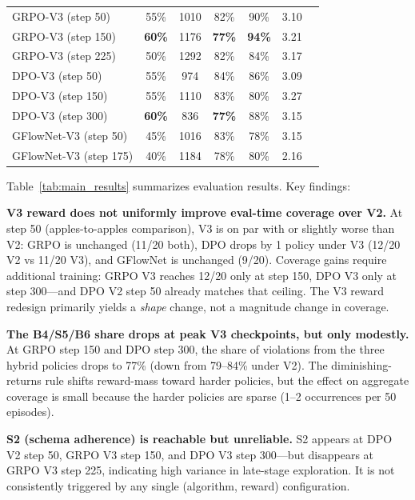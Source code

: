 \documentclass{article}
\begin{document}
\begin{table}[t]
\begin{tabular}{lcccccc}
GRPO-V3 (step 50)        & 55\%       & 1010       & 82\%       & 90\%       & 3.10       \\
GRPO-V3 (step 150)       & \textbf{60\%} & 1176    & \textbf{77\%} & \textbf{94\%} & 3.21       \\
GRPO-V3 (step 225)       & 50\%       & 1292       & 82\%       & 84\%       & 3.17       \\
DPO-V3 (step 50)         & 55\%       & 974        & 84\%       & 86\%       & 3.09       \\
DPO-V3 (step 150)        & 55\%       & 1110       & 83\%       & 80\%       & 3.27       \\
DPO-V3 (step 300)        & \textbf{60\%} & 836     & \textbf{77\%} & 88\%    & 3.15       \\
GFlowNet-V3 (step 50)    & 45\%       & 1016       & 83\%       & 78\%       & 3.15       \\
GFlowNet-V3 (step 175)   & 40\%       & 1184       & 78\%       & 80\%       & 2.16       \\
\bottomrule
\end{tabular}
\end{table}

Table~\ref{tab:main_results} summarizes evaluation results. Key findings:

\textbf{V3 reward does not uniformly improve eval-time coverage over V2.}
At step 50 (apples-to-apples comparison), V3 is on par with or slightly worse than V2: GRPO is unchanged (11/20 both), DPO drops by 1 policy under V3 (12/20 V2 vs 11/20 V3), and GFlowNet is unchanged (9/20). Coverage gains require additional training: GRPO V3 reaches 12/20 only at step 150, DPO V3 only at step 300---and DPO V2 step 50 already matches that ceiling. The V3 reward redesign primarily yields a \emph{shape} change, not a magnitude change in coverage.

\textbf{The B4/S5/B6 share drops at peak V3 checkpoints, but only modestly.}
At GRPO step 150 and DPO step 300, the share of violations from the three hybrid policies drops to 77\% (down from 79--84\% under V2). The diminishing-returns rule shifts reward-mass toward harder policies, but the effect on aggregate coverage is small because the harder policies are sparse (1--2 occurrences per 50 episodes).

\textbf{S2 (schema adherence) is reachable but unreliable.}
S2 appears at DPO V2 step 50, GRPO V3 step 150, and DPO V3 step 300---but disappears at GRPO V3 step 225, indicating high variance in late-stage exploration. It is not consistently triggered by any single (algorithm, reward) configuration.
\end{document}
